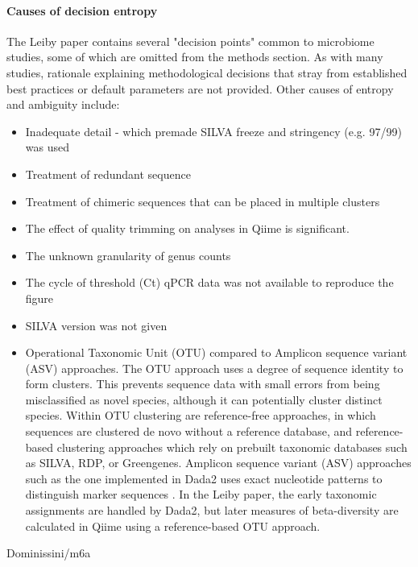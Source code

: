 \documentclass{drexelthesis}
\begin{document}
\paragraph{Causes of decision entropy}

The Leiby paper contains several "decision points" common to microbiome studies, some of which are omitted from the methods section. As with many studies, rationale explaining methodological decisions that stray from established best practices or default parameters are not provided. Other causes of entropy and ambiguity include:

\begin{itemize}
	\item Inadequate detail - which premade SILVA freeze and stringency (e.g. 97/99) was used

	\item Treatment of redundant sequence

	\item Treatment of chimeric sequences that can be placed in multiple clusters

	\item The effect of quality trimming \cite{Mohsen2019-er} on analyses in Qiime is significant.

	\item The unknown granularity of genus counts

	\item The cycle of threshold (Ct) qPCR data was not available to reproduce the figure 

	\item SILVA version was not given

	\item Operational Taxonomic Unit (OTU) compared to Amplicon sequence variant (ASV) approaches. The OTU approach uses a degree of sequence identity to form clusters. This prevents sequence data with small errors from being misclassified as novel species, although it can potentially cluster distinct species. Within OTU clustering are reference-free approaches, in which sequences are clustered de novo without a reference database, and reference-based clustering approaches which rely on prebuilt taxonomic databases such as SILVA, RDP, or Greengenes. Amplicon sequence variant (ASV) approaches such as the one implemented in Dada2 uses exact nucleotide patterns to distinguish marker sequences \cite{Callahan2015-eu}. In the Leiby paper, the early taxonomic assignments are handled by Dada2, but later measures of beta-diversity are calculated in Qiime using a reference-based OTU approach.

\end{itemize}
Dominissini/m6a
\end{document}

